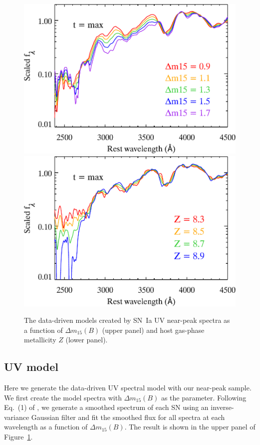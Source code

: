 \documentclass[useAMS,usenatbib]{mn2e}
\newcommand{\deltam}{\ensuremath{\Delta m_{15}}}
\begin{document}
\begin{figure}
	\centering
		\includegraphics[scale=0.5]{plot/uv_spec_model_max_dm15.pdf}\\
		\vspace{0.25cm}
		\includegraphics[scale=0.5]{plot/uv_spec_model_max_metal.pdf}\\
                \caption{The data-driven models created by SN~Ia UV near-peak spectra as a function of $\deltam(B)$ (upper panel) and host gas-phase metallicity $Z$ (lower panel).}
        \label{model-spec}
\end{figure}

\subsection{UV model}
\label{sec:model}
Here we generate the data-driven UV spectral model with our near-peak sample. We first create the model spectra with $\deltam(B)$ as the parameter. Following Eq.~(1) of \citet{2016MNRAS.461.1308F}, we generate a smoothed spectrum of each SN using an inverse-variance Gaussian filter \citep{2006AJ....131.1648B} and fit the smoothed flux for all spectra at each wavelength as a function of $\deltam(B)$. The result is shown in the upper panel of Figure~\ref{model-spec}.
\end{document}
